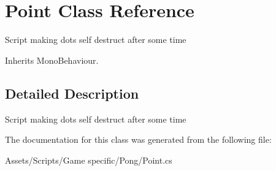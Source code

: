 \hypertarget{class_point}{\section{Point Class Reference}
\label{class_point}
}


Script making dots self destruct after some time  




Inherits Mono\-Behaviour.



\subsection{Detailed Description}
Script making dots self destruct after some time 



The documentation for this class was generated from the following file\-:\begin{DoxyCompactItemize}
\item 
Assets/\-Scripts/\-Game specific/\-Pong/Point.\-cs\end{DoxyCompactItemize}
